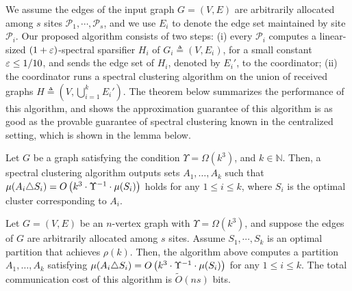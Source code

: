 We assume  the edges of the input graph $G=(V,E)$ are arbitrarily allocated among $s$ sites $\mathcal{P}_1,\cdots, \mathcal{P}_s$, and we use  $E_i$ to denote the edge set maintained by site $\mathcal{P}_i$. Our proposed algorithm consists of two steps: (i) every  $\mathcal{P}_i$ computes a linear-sized $(1+\varepsilon)$-spectral sparsifier $H_i$ of $G_i\triangleq (V, E_i)$, 
for a small constant $\varepsilon\leq 1/10$,
and sends the edge set of  $H_i$, denoted by $E_i'$, to the coordinator; (ii) the coordinator runs a spectral clustering algorithm on the union of received graphs $H\triangleq \left(V,\bigcup_{i=1}^k E_i' \right)$. The theorem  below summarizes the performance of this algorithm, and shows the approximation guarantee of this algorithm is as good as the provable guarantee of spectral clustering known in the centralized setting, which is shown in the lemma below.


\begin{lem}\label{lem:PSZ}
Let $G$ be a graph satisfying the condition $\Upsilon=\Omega(k^3)$, and $k\in \mathbb{N}$.
Then, a spectral clustering algorithm outputs sets $A_1,\ldots, A_k$ such that $\mu(A_i\triangle S_i)= O\left(k^3\cdot\Upsilon^{-1}\cdot\mu(S_i)\right)$ holds for any $1\leq i\leq k$, where $S_i$ is the optimal cluster corresponding to $A_i$.
\end{lem}



\begin{thm}\label{thm:gcss}
Let $G=(V,E)$ be an $n$-vertex graph with $\Upsilon=\Omega(k^3)$, and suppose the edges of $G$ are
arbitrarily allocated among $s$ sites.  Assume  $S_1,\cdots, S_k$ is an optimal partition that achieves $\rho(k)$.
Then, the algorithm above computes  a partition $A_1,\ldots, A_k$ satisfying $\mu(A_i\triangle S_i)= O\left( k^3\cdot\Upsilon^{-1}\cdot\mu(S_i)\right)$  for any $1\leq i\leq k$. The total communication cost of this algorithm is $\tilde{O}(ns)$ bits. 
\end{thm}


